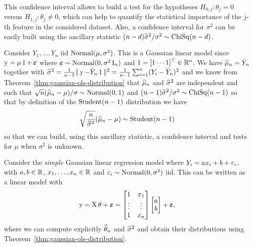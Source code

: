 This confidence interval allows to build a test for the hypotheses $H_{0, j} : \theta_j = 0$ versus $H_{1, j} : \theta_j \neq 0$, which can help to quantify the statistical importance of the $j$-th feature in the considered dataset.
Also, a confidence interval for $\sigma^2$ can be easily built using the ancillary statistic $(n - d) \widehat \sigma^2 / \sigma^2 \sim \operatorname{ChiSq}(n - d)$.

\begin{example}
	Consider $Y_1, \ldots, Y_n$ iid $\operatorname{Normal}(\mu, \sigma^2)$. This is a Gaussian linear model since $\operatorname{{\boldsymbol y}} = \mu \operatorname{\boldsymbol 1} + \operatorname{\boldsymbol \varepsilon}$ where $\operatorname{\boldsymbol \varepsilon} \sim \operatorname{Normal}(0, \sigma^2 \operatorname{{\boldsymbol I}}_n)$ and $\operatorname{\boldsymbol 1} = [1 \cdots 1]^\top \in \mathbb R^n$.
	We have%
	$\widehat \mu_n = \bar Y_n$ together with $\widehat \sigma^2 = \frac{1}{n-1} \| \operatorname{{\boldsymbol y}} - \bar Y_n \operatorname{\boldsymbol 1} \|^2 = \frac{1}{n-1} \sum_{i=1}^n (Y_i - \bar Y_n)^2$ and we know from Theorem~\ref{thm:gaussian-ols-distribution} that $\widehat \mu_n$ and $\widehat \sigma^2$ are independent and such that $\sqrt n (\widehat \mu_n - \mu) / \sigma \sim \operatorname{Normal}(0, 1)$ and $(n-1) \widehat \sigma^2/\sigma^2 \sim \operatorname{ChiSq}(n-1)$ so that by definition of the $\operatorname{Student}(n-1)$ distribution we have
	\begin{equation*}
		\sqrt{\frac{n}{\widehat \sigma^2}} (\widehat \mu_n - \mu) \sim \operatorname{Student}(n-1)
	\end{equation*}
	so that we can build, using this ancillary statistic, a confidence interval and tests for $\mu$ when $\sigma^2$ is unknown.
\end{example}

\begin{example}
	Consider the \emph{simple} Gaussian linear regression model where $Y_i = a x_i + b + \varepsilon_i$, with $a, b \in \mathbb R$, $x_1, \ldots, x_n \in \mathbb R$ and $\varepsilon_i \sim \operatorname{Normal}(0, \sigma^2)$ iid. This can be written as a linear model with
	\begin{equation*}
		\operatorname{{\boldsymbol y}} = \operatorname{{\boldsymbol X}} \theta + \operatorname{\boldsymbol \varepsilon} =
		\begin{bmatrix}
			1 & x_1 \\
			\vdots & \vdots \\
			1 & x_n
		\end{bmatrix}
		\begin{bmatrix}
			a \\
			b
		\end{bmatrix}
		+ \operatorname{\boldsymbol \varepsilon},
	\end{equation*}
	where we can compute explicitly $\widehat \theta_n$ and $\widehat \sigma^2$ and obtain their distributions using Theorem~\ref{thm:gaussian-ols-distribution}.
\end{example}

